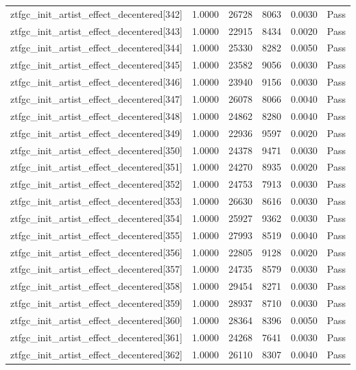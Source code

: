 \begin{table}[htbp]
\begin{tabular}{llrrll}
ztfgc\_init\_artist\_effect\_decentered[342] & 1.0000 & 26728 & 8063 & 0.0030 & Pass \\
ztfgc\_init\_artist\_effect\_decentered[343] & 1.0000 & 22915 & 8434 & 0.0020 & Pass \\
ztfgc\_init\_artist\_effect\_decentered[344] & 1.0000 & 25330 & 8282 & 0.0050 & Pass \\
ztfgc\_init\_artist\_effect\_decentered[345] & 1.0000 & 23582 & 9056 & 0.0030 & Pass \\
ztfgc\_init\_artist\_effect\_decentered[346] & 1.0000 & 23940 & 9156 & 0.0030 & Pass \\
ztfgc\_init\_artist\_effect\_decentered[347] & 1.0000 & 26078 & 8066 & 0.0040 & Pass \\
ztfgc\_init\_artist\_effect\_decentered[348] & 1.0000 & 24862 & 8280 & 0.0040 & Pass \\
ztfgc\_init\_artist\_effect\_decentered[349] & 1.0000 & 22936 & 9597 & 0.0020 & Pass \\
ztfgc\_init\_artist\_effect\_decentered[350] & 1.0000 & 24378 & 9471 & 0.0030 & Pass \\
ztfgc\_init\_artist\_effect\_decentered[351] & 1.0000 & 24270 & 8935 & 0.0020 & Pass \\
ztfgc\_init\_artist\_effect\_decentered[352] & 1.0000 & 24753 & 7913 & 0.0030 & Pass \\
ztfgc\_init\_artist\_effect\_decentered[353] & 1.0000 & 26630 & 8616 & 0.0030 & Pass \\
ztfgc\_init\_artist\_effect\_decentered[354] & 1.0000 & 25927 & 9362 & 0.0030 & Pass \\
ztfgc\_init\_artist\_effect\_decentered[355] & 1.0000 & 27993 & 8519 & 0.0040 & Pass \\
ztfgc\_init\_artist\_effect\_decentered[356] & 1.0000 & 22805 & 9128 & 0.0020 & Pass \\
ztfgc\_init\_artist\_effect\_decentered[357] & 1.0000 & 24735 & 8579 & 0.0030 & Pass \\
ztfgc\_init\_artist\_effect\_decentered[358] & 1.0000 & 29454 & 8271 & 0.0030 & Pass \\
ztfgc\_init\_artist\_effect\_decentered[359] & 1.0000 & 28937 & 8710 & 0.0030 & Pass \\
ztfgc\_init\_artist\_effect\_decentered[360] & 1.0000 & 28364 & 8396 & 0.0050 & Pass \\
ztfgc\_init\_artist\_effect\_decentered[361] & 1.0000 & 24268 & 7641 & 0.0030 & Pass \\
ztfgc\_init\_artist\_effect\_decentered[362] & 1.0000 & 26110 & 8307 & 0.0040 & Pass \\

\end{tabular}
\end{table}
